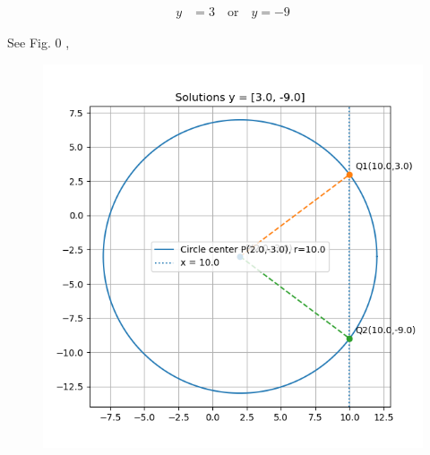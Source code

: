 \documentclass[journal]{IEEEtran}
\begin{document}
\begin{align*}
y &= 3 \quad \text{or} \quad y = -9
\end{align*}

\newpage
See Fig. 0 ,
\begin{figure}[H]
\begin{center}
\includegraphics[width=0.6\columnwidth]{figs/fig.png}
\end{center}
\caption{}
\label{fig:Fig1}
\end{figure}
\end{document}
